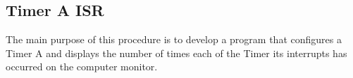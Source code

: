 \subsection{Timer A ISR}

The main purpose of this procedure is to develop a program that configures a Timer A and displays the number of times each of the Timer its interrupts has occurred on the computer monitor.